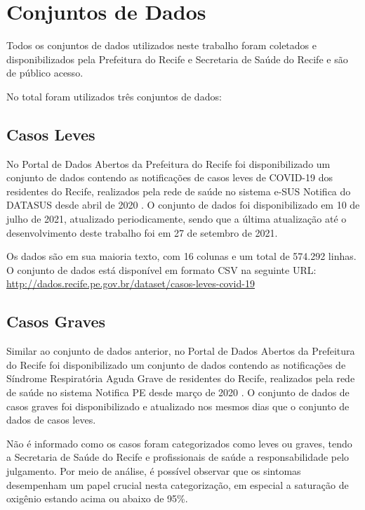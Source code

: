\section{Conjuntos de Dados}
\label{sec:dataset}

Todos os conjuntos de dados utilizados neste trabalho foram coletados e disponibilizados pela Prefeitura do Recife e Secretaria de Saúde do Recife e são de público acesso.

No total foram utilizados três conjuntos de dados:

\subsection{Casos Leves}
\label{subsec:casosleves}

No Portal de Dados Abertos da Prefeitura do Recife foi disponibilizado um conjunto de dados contendo as notificações de casos leves de COVID-19 dos residentes do Recife, realizados pela rede de saúde no sistema e-SUS Notifica do DATASUS desde abril de 2020 \cite{casosleves}. O conjunto de dados foi disponibilizado em 10 de julho de 2021, atualizado periodicamente, sendo que a última atualização até o desenvolvimento deste trabalho foi em 27 de setembro de 2021.

Os dados são em sua maioria texto, com 16 colunas e um total de 574.292 linhas. 
O conjunto de dados está disponível em formato CSV na seguinte URL: 
\url{http://dados.recife.pe.gov.br/dataset/casos-leves-covid-19}





\subsection{Casos Graves}
\label{subsec:casosgraves}

Similar ao conjunto de dados anterior, no Portal de Dados Abertos da Prefeitura do Recife foi disponibilizado um conjunto de dados contendo as notificações de Síndrome Respiratória Aguda Grave de residentes do Recife, realizados pela rede de saúde no sistema Notifica PE desde março de 2020 \cite{casosgraves}. O conjunto de dados de casos graves foi disponibilizado e atualizado nos mesmos dias que o conjunto de dados de casos leves.

Não é informado como os casos foram categorizados como leves ou graves, tendo a Secretaria de Saúde do Recife e profissionais de saúde a responsabilidade pelo julgamento. Por meio de análise, é possível observar que os sintomas desempenham um papel crucial nesta categorização, em especial a saturação de oxigênio estando acima ou abaixo de 95\%.

